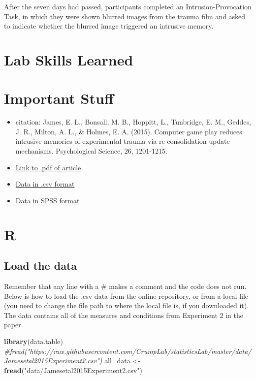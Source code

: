 \documentclass[]{book}
\newenvironment{Shaded}{\begin{snugshade}}{\end{snugshade}}
\newcommand{\KeywordTok}[1]{\textcolor[rgb]{0.13,0.29,0.53}{\textbf{{#1}}}}
\newcommand{\StringTok}[1]{\textcolor[rgb]{0.31,0.60,0.02}{{#1}}}
\newcommand{\CommentTok}[1]{\textcolor[rgb]{0.56,0.35,0.01}{\textit{{#1}}}}
\newcommand{\NormalTok}[1]{{#1}}
\providecommand{\tightlist}{%
  \setlength{\itemsep}{0pt}\setlength{\parskip}{0pt}}
\theoremstyle{definition}
\theoremstyle{definition}
\theoremstyle{definition}
\theoremstyle{remark}
\begin{document}
After the seven days had passed, participants completed an
Intrusion-Provocation Task, in which they were shown blurred images from
the trauma film and asked to indicate whether the blurred image
triggered an intrusive memory.

\section{Lab Skills Learned}\label{lab-skills-learned-2}

\section{Important Stuff}\label{important-stuff-2}

\begin{itemize}
\tightlist
\item
  citation: James, E. L., Bonsall, M. B., Hoppitt, L., Tunbridge, E. M.,
  Geddes, J. R., Milton, A. L., \& Holmes, E. A. (2015). Computer game
  play reduces intrusive memories of experimental trauma via
  re-consolidation-update mechanisms. Psychological Science, 26,
  1201-1215.
\item
  \href{http://journals.sagepub.com/stoken/default+domain/hQ2W4fbPrZVJ7eyNJaqu/full}{Link
  to .pdf of article}
\item
  \href{https://drive.google.com/open?id=0Bz-rhZ21ShvOM1cxWUpUNlQ0UlE}{Data
  in .csv format}
\item
  \href{https://drive.google.com/file/d/0Bz-rhZ21ShvOZ1lvQ0dQekZGWU0/view?usp=sharing}{Data
  in SPSS format}
\end{itemize}

\section{R}\label{r-8}

\subsection{Load the data}\label{load-the-data-1}

Remember that any line with a \# makes a comment and the code does not
run. Below is how to load the .csv data from the online repository, or
from a local file (you need to change the file path to where the local
file is, if you downloaded it). The data contains all of the measures
and conditions from Experiment 2 in the paper.

\begin{Shaded}
\begin{Highlighting}[]
\KeywordTok{library}\NormalTok{(data.table)}
\CommentTok{#fread("https://raw.githubusercontent.com/CrumpLab/statisticsLab/master/data/Jamesetal2015Experiment2.csv")}
\NormalTok{all_data <-}\StringTok{ }\KeywordTok{fread}\NormalTok{(}\StringTok{"data/Jamesetal2015Experiment2.csv"}\NormalTok{)}
\end{Highlighting}
\end{Shaded}
\end{document}

